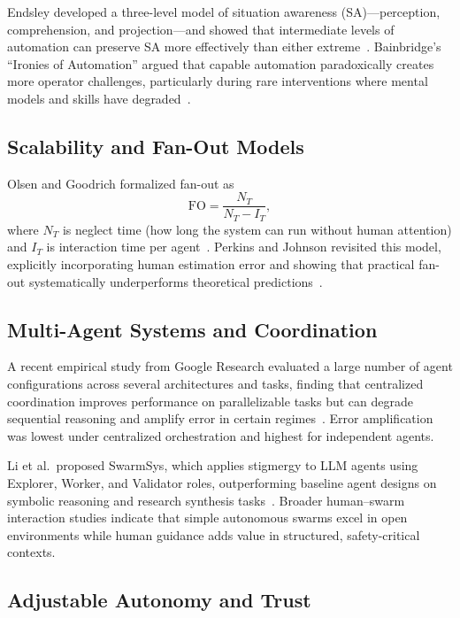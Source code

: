 \documentclass[11pt]{article}
\begin{document}
Endsley developed a three-level model of situation awareness (SA)---perception, comprehension, and projection---and showed that intermediate levels of automation can preserve SA more effectively than either extreme~\cite{endsley1995toward}. Bainbridge's ``Ironies of Automation'' argued that capable automation paradoxically creates more operator challenges, particularly during rare interventions where mental models and skills have degraded~\cite{bainbridge1983ironies}.

\subsection{Scalability and Fan-Out Models}

Olsen and Goodrich formalized fan-out as
\begin{equation}
\mathrm{FO} = \frac{N_T}{N_T - I_T},
\end{equation}
where $N_T$ is neglect time (how long the system can run without human attention) and $I_T$ is interaction time per agent~\cite{olsen2004fan}. Perkins and Johnson revisited this model, explicitly incorporating human estimation error and showing that practical fan-out systematically underperforms theoretical predictions~\cite{perkins2024fanout}.

\subsection{Multi-Agent Systems and Coordination}

A recent empirical study from Google Research evaluated a large number of agent configurations across several architectures and tasks, finding that centralized coordination improves performance on parallelizable tasks but can degrade sequential reasoning and amplify error in certain regimes~\cite{kim2026scaling}. Error amplification was lowest under centralized orchestration and highest for independent agents.

Li et al.\ proposed SwarmSys, which applies stigmergy to LLM agents using Explorer, Worker, and Validator roles, outperforming baseline agent designs on symbolic reasoning and research synthesis tasks~\cite{li2025swarmsys}. Broader human--swarm interaction studies indicate that simple autonomous swarms excel in open environments while human guidance adds value in structured, safety-critical contexts.

\subsection{Adjustable Autonomy and Trust}
\end{document}

